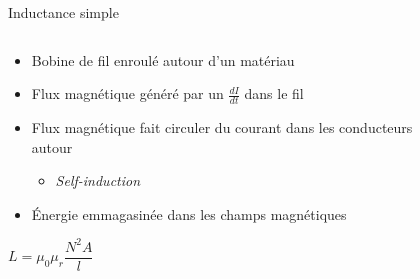 \begin{frame}{Inductance simple}
    \begin{columns}
        \begin{column}{0.66\textwidth}
            \begin{itemize}
                \item Bobine de fil enroulé autour d'un matériau
                \item Flux magnétique généré par un $\frac{dI}{dt}$ dans le fil
                \item Flux magnétique fait circuler du courant dans les conducteurs autour
                \begin{itemize}
                    \item \textit{Self-induction}
                \end{itemize}
                \item Énergie emmagasinée dans les champs magnétiques
            \end{itemize}
            \par
            \Large{
            \begin{center}
                $L = \mu_0 \mu_r \dfrac{N^2A}{l}$
            \end{center}
            }
        \end{column}

        \begin{column}{0.33\textwidth}
            \begin{figure}
                \centering
            \end{figure}
        \end{column}
    \end{columns}
\end{frame}

